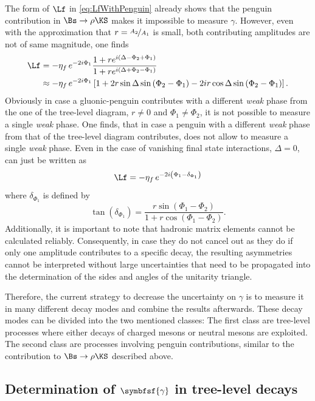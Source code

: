 The form of $\Lf$ in \cref{eq:LfWithPenguin} already shows that the penguin contribution in $\Bs\to\rho\KS$ makes it impossible to measure $\gamma$.
However, even with the approximation that $r=\nicefrac{A_2}{A_1}$ is small, \ie both contributing amplitudes are not of same magnitude, one finds
\begin{align}
\Lf&=-\eta_f\,e^{-2i\Phi_1}\frac{1+re^{i\left(\Delta-\Phi_2+\Phi_1\right)}}{1+re^{i\left(\Delta+\Phi_2-\Phi_1\right)}}\nonumber\\
&\approx-\eta_f\,e^{-2i\Phi_1}\left[1+2r\sin\Delta\sin\left(\Phi_2-\Phi_1\right)-2ir\cos\Delta\sin\left(\Phi_2-\Phi_1\right)\right].
\end{align}
Obviously in case a gluonic-penguin contributes with a different \emph{weak} phase from the one of the tree-level diagram, \ie $r\neq0$ and $\Phi_1\neq\Phi_2$, it is not possible to measure a single \emph{weak} phase.
One finds, that in case a penguin with a different \emph{weak} phase from that of the tree-level diagram contributes, \Lf does not allow to measure a single \emph{weak} phase.
Even in the case of vanishing final state interactions, \ie $\Delta=0$, \Lf can just be written as
\begin{equation}
\Lf=-\eta_f\,e^{-2i\left(\Phi_1-\delta_{\Phi_1}\right)}
\end{equation}
where $\delta_{\Phi_1}$ is defined by
\begin{equation}
\tan\left(\delta_{\Phi_1}\right)=\frac{r\sin\left(\Phi_1-\Phi_2\right)}{1+r\cos\left(\Phi_1-\Phi_2\right)}.
\end{equation}
Additionally, it is important to note that hadronic matrix elements cannot be calculated reliably.
Consequently, in case they do not cancel out as they do if only one amplitude contributes to a specific decay, the resulting \CP asymmetries cannot be interpreted without large uncertainties that need to be propagated into the determination of the sides and angles of the unitarity triangle.

Therefore, the current strategy to decrease the uncertainty on $\gamma$ is to measure it in many different decay modes and combine the results afterwards.
These decay modes can be divided into the two mentioned classes: The first class are tree-level processes where either decays of charged \B mesons or neutral \B mesons are exploited.
The second class are processes involving penguin contributions, similar to the contribution to $\Bs\to\rho\KS$ described above.

\subsection[head={Determination of $\gamma$ in tree-level decays},tocentry={Determination of $\gamma$ in tree-level decays}]{Determination of $\symbfsf{\gamma}$ in tree-level decays}
\label{sec:gamamInTrees}

